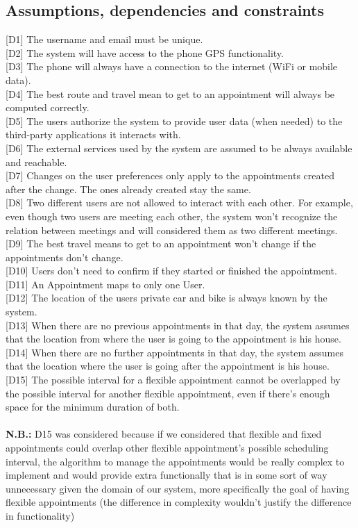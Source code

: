 \documentclass[12pt]{article}
\begin{document}
\subsection{Assumptions, dependencies and constraints}
[D1] The username and email must be unique.\\{}
[D2] The system will have access to the phone GPS functionality.\\{}
[D3] The phone will always have a connection to the internet (WiFi or mobile data).\\{}
[D4] The best route and travel mean to get to an appointment will always be computed correctly.\\{}
[D5] The users authorize the system to provide user data (when needed) to the third-party applications it interacts with.\\{}
[D6] The external services used by the system are assumed to be always available and reachable.\\{}
[D7] Changes on the user preferences only apply to the appointments created after the change. The ones already created stay the same.\\{}
[D8] Two different users are not allowed to interact with each other. For example, even though two users are meeting each other, the system won't recognize the relation between meetings and will considered them as two different meetings.\\{}
[D9] The best travel means to get to an appointment won't change if the appointments don't change.\\{}
[D10] Users don't need to confirm if they started or finished the appointment.\\{}
[D11] An Appointment maps to only one User.\\{}
[D12] The location of the users private car and bike is always known by the system.\\{}
[D13] When there are no previous appointments in that day, the system assumes that the location from where the user is going to the appointment is his house.\\{}
[D14] When there are no further appointments in that day, the system assumes that the location where the user is going after the appointment is his house.\\{}
[D15] The possible interval for a flexible appointment cannot be overlapped by the possible interval for another flexible appointment, even if there's enough space for the minimum duration of both.\\{}\\{}
\textbf{N.B.:} D15 was considered because if we considered that flexible and fixed appointments could overlap other flexible appointment's possible scheduling interval, the algorithm to manage the appointments would be really complex to implement and would provide extra functionally that is in some sort of way unnecessary given the domain of our system, more specifically the goal of having flexible appointments (the difference in complexity wouldn't justify the difference in functionality)
\end{document}

